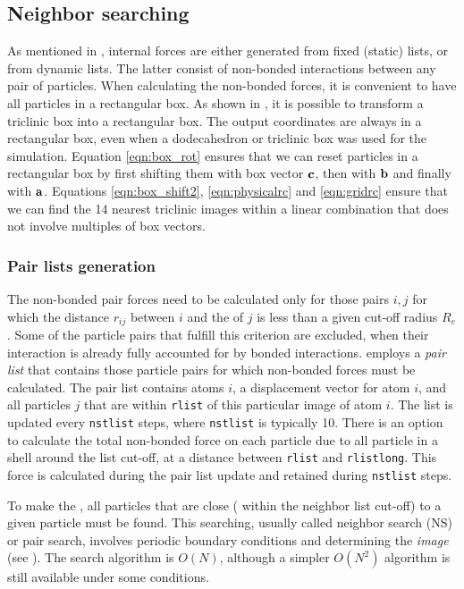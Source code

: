 \subsection{Neighbor searching}
\label{subsec:ns}
As mentioned in , internal forces are
either generated from fixed (static) lists, or from dynamic lists.
The latter consist of non-bonded interactions between any pair of particles.
When calculating the non-bonded forces, it is convenient to have all
particles in a rectangular box.
As shown in , it is possible to transform a
triclinic box into a rectangular box.
The output coordinates are always in a rectangular box, even when a
dodecahedron or triclinic box was used for the simulation.
Equation \ref{eqn:box_rot} ensures that we can reset particles
in a rectangular box by first shifting them with
box vector ${\bf c}$, then with ${\bf b}$ and finally with ${\bf a}$.
Equations \ref{eqn:box_shift2}, \ref{eqn:physicalrc} and \ref{eqn:gridrc}
ensure that we can find the 14 nearest triclinic images within
a linear combination that does not involve multiples of box vectors.

\subsubsection{Pair lists generation}
The non-bonded pair forces need to be calculated only for those pairs
$i,j$  for which the distance $r_{ij}$ between $i$ and the 
of $j$ is less than a given cut-off radius $R_c$. Some of the particle
pairs that fulfill this criterion are excluded, when their interaction
is already fully accounted for by bonded interactions.  {\gromacs}
employs a {\em pair list} that contains those particle pairs for which
non-bonded forces must be calculated.  The pair list contains atoms
$i$, a displacement vector for atom $i$, and all particles $j$ that
are within \verb'rlist' of this particular image of atom $i$.  The
list is updated every \verb'nstlist' steps, where \verb'nstlist' is
typically 10. There is an option to calculate the total non-bonded
force on each particle due to all particle in a shell around the
list cut-off, {\ie} at a distance between \verb'rlist' and
\verb'rlistlong'.  This force is calculated during the pair list update
and  retained during \verb'nstlist' steps.

To make the , all particles that are close
({\ie} within the neighbor list cut-off) to a given particle must be found.
This searching, usually called neighbor search (NS) or pair search,
involves periodic boundary conditions and determining the {\em image}
(see ). The search algorithm is $O(N)$, although a simpler
$O(N^2)$ algorithm is still available under some conditions.

